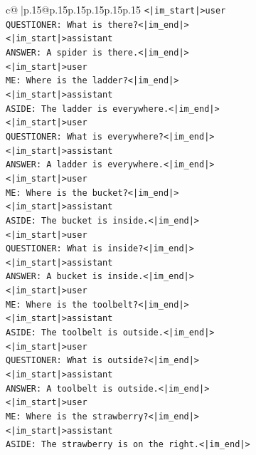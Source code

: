 \documentclass{article}
\begin{document}
{\begin{supertabular}{c@{$\;$}|p{.15\linewidth}@{}p{.15\linewidth}p{.15\linewidth}p{.15\linewidth}p{.15\linewidth}p{.15\linewidth}}
{{{\texttt{<|im\_start|>user} \\
\texttt{QUESTIONER: What is there?<|im\_end|>} \\
\texttt{<|im\_start|>assistant} \\
\texttt{ANSWER: A spider is there.<|im\_end|>} \\
\texttt{<|im\_start|>user} \\
\texttt{ME: Where is the ladder?<|im\_end|>} \\
\texttt{<|im\_start|>assistant} \\
\texttt{ASIDE: The ladder is everywhere.<|im\_end|>} \\
\texttt{<|im\_start|>user} \\
\texttt{QUESTIONER: What is everywhere?<|im\_end|>} \\
\texttt{<|im\_start|>assistant} \\
\texttt{ANSWER: A ladder is everywhere.<|im\_end|>} \\
\texttt{<|im\_start|>user} \\
\texttt{ME: Where is the bucket?<|im\_end|>} \\
\texttt{<|im\_start|>assistant} \\
\texttt{ASIDE: The bucket is inside.<|im\_end|>} \\
\texttt{<|im\_start|>user} \\
\texttt{QUESTIONER: What is inside?<|im\_end|>} \\
\texttt{<|im\_start|>assistant} \\
\texttt{ANSWER: A bucket is inside.<|im\_end|>} \\
\texttt{<|im\_start|>user} \\
\texttt{ME: Where is the toolbelt?<|im\_end|>} \\
\texttt{<|im\_start|>assistant} \\
\texttt{ASIDE: The toolbelt is outside.<|im\_end|>} \\
\texttt{<|im\_start|>user} \\
\texttt{QUESTIONER: What is outside?<|im\_end|>} \\
\texttt{<|im\_start|>assistant} \\
\texttt{ANSWER: A toolbelt is outside.<|im\_end|>} \\
\texttt{<|im\_start|>user} \\
\texttt{ME: Where is the strawberry?<|im\_end|>} \\
\texttt{<|im\_start|>assistant} \\
\texttt{ASIDE: The strawberry is on the right.<|im\_end|>} \\
}}}
\end{supertabular}}
\end{document}
